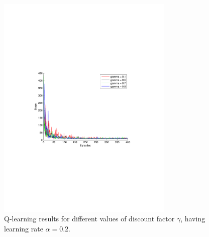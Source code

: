 \documentclass[a4paper,11pt]{article}
\begin{document}
\begin{figure}[h!]
  \centering
    \includegraphics[trim=4cm 8.5cm 4cm 8.5cm,clip,width=0.75\textwidth]{figures/qla02.pdf}
    \caption{Q-learning results for different values of discount factor $\gamma$, having learning rate $\alpha = 0.2$.}
    \label{q02}
\end{figure}
\end{document}
